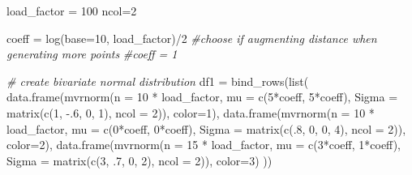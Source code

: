 \documentclass[
]{article}
\newenvironment{Shaded}{\begin{snugshade}}{\end{snugshade}}
\newcommand{\AttributeTok}[1]{\textcolor[rgb]{0.77,0.63,0.00}{#1}}
\newcommand{\CommentTok}[1]{\textcolor[rgb]{0.56,0.35,0.01}{\textit{#1}}}
\newcommand{\DecValTok}[1]{\textcolor[rgb]{0.00,0.00,0.81}{#1}}
\newcommand{\FunctionTok}[1]{\textcolor[rgb]{0.00,0.00,0.00}{#1}}
\newcommand{\NormalTok}[1]{#1}
\newcommand{\OtherTok}[1]{\textcolor[rgb]{0.56,0.35,0.01}{#1}}
\newcommand{\SpecialCharTok}[1]{\textcolor[rgb]{0.00,0.00,0.00}{#1}}
\begin{document}
\begin{Shaded}
\begin{Highlighting}[]
\NormalTok{load\_factor }\OtherTok{=} \DecValTok{100}
\NormalTok{ncol}\OtherTok{=}\DecValTok{2}

\NormalTok{coeff }\OtherTok{=} \FunctionTok{log}\NormalTok{(}\AttributeTok{base=}\DecValTok{10}\NormalTok{, load\_factor)}\SpecialCharTok{/}\DecValTok{2}    \CommentTok{\#choose if augmenting distance when generating more points}
\CommentTok{\#coeff = 1}
  
\CommentTok{\# create bivariate normal distribution}
\NormalTok{df1 }\OtherTok{=} \FunctionTok{bind\_rows}\NormalTok{(}\FunctionTok{list}\NormalTok{(}
  \FunctionTok{data.frame}\NormalTok{(}\FunctionTok{mvrnorm}\NormalTok{(}\AttributeTok{n =} \DecValTok{10} \SpecialCharTok{*}\NormalTok{ load\_factor, }\AttributeTok{mu =} \FunctionTok{c}\NormalTok{(}\DecValTok{5}\SpecialCharTok{*}\NormalTok{coeff, }\DecValTok{5}\SpecialCharTok{*}\NormalTok{coeff), }\AttributeTok{Sigma =} \FunctionTok{matrix}\NormalTok{(}\FunctionTok{c}\NormalTok{(}\DecValTok{1}\NormalTok{, }\SpecialCharTok{{-}}\NormalTok{.}\DecValTok{6}\NormalTok{, }\DecValTok{0}\NormalTok{, }\DecValTok{1}\NormalTok{), }\AttributeTok{ncol =} \DecValTok{2}\NormalTok{)), }\AttributeTok{color=}\DecValTok{1}\NormalTok{),}
  \FunctionTok{data.frame}\NormalTok{(}\FunctionTok{mvrnorm}\NormalTok{(}\AttributeTok{n =} \DecValTok{10} \SpecialCharTok{*}\NormalTok{ load\_factor, }\AttributeTok{mu =} \FunctionTok{c}\NormalTok{(}\DecValTok{0}\SpecialCharTok{*}\NormalTok{coeff, }\DecValTok{0}\SpecialCharTok{*}\NormalTok{coeff), }\AttributeTok{Sigma =} \FunctionTok{matrix}\NormalTok{(}\FunctionTok{c}\NormalTok{(.}\DecValTok{8}\NormalTok{, }\DecValTok{0}\NormalTok{, }\DecValTok{0}\NormalTok{, }\DecValTok{4}\NormalTok{), }\AttributeTok{ncol =} \DecValTok{2}\NormalTok{)), }\AttributeTok{color=}\DecValTok{2}\NormalTok{),}
  \FunctionTok{data.frame}\NormalTok{(}\FunctionTok{mvrnorm}\NormalTok{(}\AttributeTok{n =} \DecValTok{15} \SpecialCharTok{*}\NormalTok{ load\_factor, }\AttributeTok{mu =} \FunctionTok{c}\NormalTok{(}\DecValTok{3}\SpecialCharTok{*}\NormalTok{coeff, }\DecValTok{1}\SpecialCharTok{*}\NormalTok{coeff), }\AttributeTok{Sigma =} \FunctionTok{matrix}\NormalTok{(}\FunctionTok{c}\NormalTok{(}\DecValTok{3}\NormalTok{, .}\DecValTok{7}\NormalTok{, }\DecValTok{0}\NormalTok{, }\DecValTok{2}\NormalTok{), }\AttributeTok{ncol =} \DecValTok{2}\NormalTok{)), }\AttributeTok{color=}\DecValTok{3}\NormalTok{)}
\NormalTok{))}


\end{Highlighting}
\end{Shaded}
\end{document}
